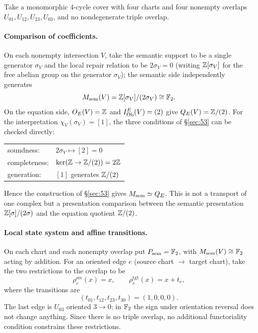 \begin{example}\label{ex:circle}
Take a monomorphic 4-cycle cover with four charts and four nonempty
overlaps $U_{01}, U_{12}, U_{23}, U_{03}$, and no nondegenerate triple
overlap.

\paragraph{Comparison of coefficients.}
On each nonempty intersection $V$, take the semantic support to be a
single generator $\sigma_V$ and the local repair relation to be
$2\sigma_V=0$ (writing $\mathbb{Z}[\sigma_V]$ for the free abelian group on
the generator $\sigma_V$); the semantic side independently generates
\[
M_{\mathrm{sem}}(V)=\mathbb{Z}[\sigma_V]/(2\sigma_V)\cong\mathbb{F}_{2}.
\]
On the equation side, $O_{E}(V)=\mathbb{Z}$ and $I_{\mathrm{Ob}}^{E}(V)=(2)$ give
$Q_{E}(V)=\mathbb{Z}/(2)$. For the interpretation $\chi_V(\sigma_V)=[1]$,
the three conditions of \S\ref{sec:53} can be checked directly:
\begin{center}
\small
\begin{tabular}{ll}
soundness: & $2\sigma_V \mapsto [2] = 0$\\
completeness: & $\ker(\mathbb{Z} \to \mathbb{Z}/(2)) = 2\mathbb{Z}$\\
generation: & $[1]$ generates $\mathbb{Z}/(2)$\\
\end{tabular}
\end{center}
Hence the construction of \S\ref{sec:53} gives $M_{\mathrm{sem}}\simeq Q_{E}$.
This is not a transport of one complex but a presentation comparison
between the semantic presentation $\mathbb{Z}[\sigma]/(2\sigma)$ and the
equation quotient $\mathbb{Z}/(2)$.

\paragraph{Local state system and affine transitions.}
On each chart and each nonempty overlap put $P_{\mathrm{sem}}=\mathbb{F}_{2}$, with
$M_{\mathrm{sem}}(V)\cong\mathbb{F}_{2}$ acting by addition. For an oriented edge $e$
(source chart $\to$ target chart), take the two restrictions to the
overlap to be
\[
\rho^{\mathrm{src}}_e(x)=x,
\qquad
\rho^{\mathrm{tgt}}_e(x)=x+t_e,
\]
where the transitions are
\[
(t_{01},t_{12},t_{23},t_{30})=(1,0,0,0).
\]
The last edge is $U_{03}$ oriented $3\to0$; in $\mathbb{F}_{2}$ the sign under
orientation reversal does not change anything. Since there is no
triple overlap, no additional functoriality condition constrains
these restrictions.


\end{example}

